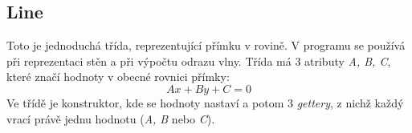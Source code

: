 \subsection{Line}
Toto je jednoduchá třída, reprezentující přímku v rovině. V programu se používá při reprezentaci stěn a při výpočtu odrazu vlny. Třída má  3 atributy \textit{A, B, C}, které značí hodnoty v obecné rovnici přímky:\\
\[
Ax + By + C = 0
\]
Ve třídě je konstruktor, kde se hodnoty nastaví a potom 3 \textit{gettery}, z nichž každý vrací právě jednu hodnotu (\textit{A, B} nebo \textit{C}).